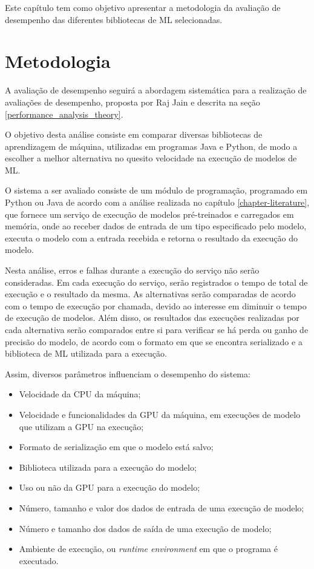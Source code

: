 Este capítulo tem como objetivo apresentar a metodologia da avaliação de desempenho das diferentes bibliotecas de ML selecionadas.

\section{Metodologia}

A avaliação de desempenho seguirá a abordagem sistemática para a realização de avaliações de desempenho, proposta por Raj Jain e descrita na seção \ref{performance_analysis_theory}.

O objetivo desta análise consiste em comparar diversas bibliotecas de aprendizagem de máquina, utilizadas em programas Java e Python, de modo a escolher a melhor alternativa no quesito velocidade na execução de modelos de ML.

O sistema a ser avaliado consiste de um módulo de programação, programado em Python ou Java de acordo com a análise realizada no capítulo \ref{chapter-literature}, que fornece um serviço de execução de modelos pré-treinados e carregados em memória, onde ao receber dados de entrada de um tipo especificado pelo modelo, executa o modelo com a entrada recebida e retorna o resultado da execução do modelo.

Nesta análise, erros e falhas durante a execução do serviço não serão consideradas. Em cada execução do serviço, serão registrados o tempo de total de execução e o resultado da mesma. As alternativas serão comparadas de acordo com o tempo de execução por chamada, devido ao interesse em diminuir o tempo de execução de modelos. Além disso, os resultados das execuções realizadas por cada alternativa serão comparados entre si para verificar se há perda ou ganho de precisão do modelo, de acordo com o formato em que se encontra serializado e a biblioteca de ML utilizada para a execução.

Assim, diversos parâmetros influenciam o desempenho do sistema:

\begin{itemize}
  \item Velocidade da CPU da máquina;
  \item Velocidade e funcionalidades da GPU da máquina, em execuções de modelo que utilizam a GPU na execução;
  \item Formato de serialização em que o modelo está salvo;
  \item Biblioteca utilizada para a execução do modelo;
  \item Uso ou não da GPU para a execução do modelo;
  \item Número, tamanho e valor dos dados de entrada de uma execução de modelo;
  \item Número e tamanho dos dados de saída de uma execução de modelo;
  \item Ambiente de execução, ou \textit{runtime environment} em que o programa é executado.
\end{itemize}

